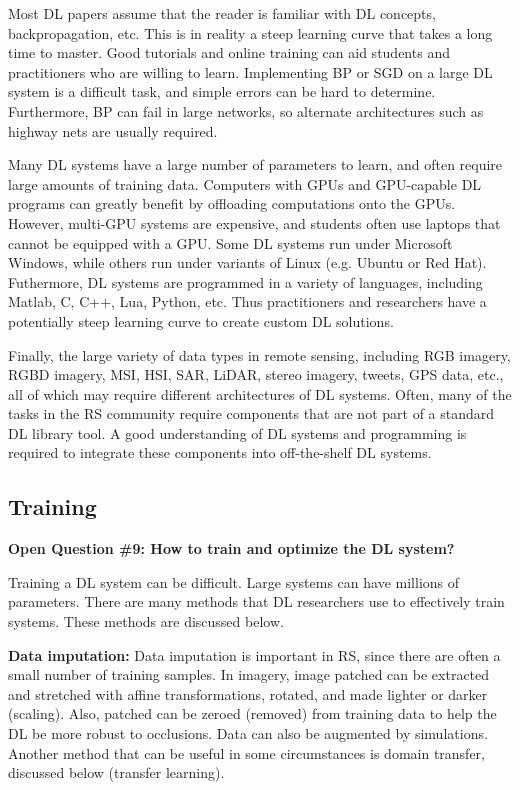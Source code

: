 \documentclass[12pt]{spieman}
\begin{document}
\begin{spacing}{1}
Most DL papers assume that the reader is familiar with DL concepts, backpropagation, etc. This is in reality a steep learning curve that takes a long time to master. Good tutorials and online training can aid students and practitioners who are willing to learn. Implementing BP or SGD on a large DL system is a difficult task, and simple errors can be hard to determine. Furthermore, BP can fail in large networks, so alternate architectures such as highway nets are usually required.

Many DL systems have a large number of parameters to learn, and often require large amounts of training data. Computers with GPUs and GPU-capable DL programs can greatly benefit by offloading computations onto the GPUs. However, multi-GPU systems are expensive, and students often use laptops that cannot be equipped with a GPU. Some DL systems run under Microsoft Windows, while others run under variants of Linux (e.g. Ubuntu or Red Hat). Futhermore, DL systems are programmed in a variety of languages, including Matlab, C, C++, Lua, Python, etc. Thus practitioners and researchers have a potentially steep learning curve to create custom DL solutions.

Finally, the large variety of data types in remote sensing, including RGB imagery, RGBD imagery, MSI, HSI, SAR, LiDAR, stereo imagery, tweets, GPS data, etc., all of which may require different architectures of DL systems. Often, many of the tasks in the RS community require components that are not part of a standard DL library tool. A good understanding of DL systems and programming is required to integrate these components into off-the-shelf DL systems.

%
%

\subsection{Training}
\label{subsec:ChallengesOpportunities_ix}
\textbf{Open Question \#9: How to train and optimize the DL system?}

Training a DL system can be difficult. Large systems can have millions of parameters. There are many methods that DL researchers use to effectively train systems. These methods are discussed below.

\textbf{Data imputation:} Data imputation \cite{hinton2006fast} is important in RS, since there are often a small number of training samples. In imagery, image patched can be extracted and stretched with affine transformations, rotated, and made lighter or darker (scaling). Also, patched can be zeroed (removed) from training data to help the DL be more robust to occlusions. Data can also be augmented by simulations. Another method that can be useful in some circumstances is domain transfer, discussed below (transfer learning).


\end{spacing}
\end{document}
